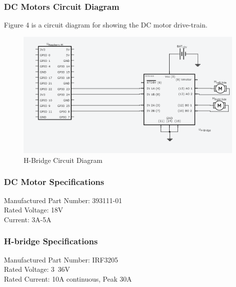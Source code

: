 \documentclass [10pt]{article}
\begin{document}

\subsubsection{DC Motors Circuit Diagram}
Figure 4 is a circuit diagram for showing the DC motor drive-train.
\begin{figure} [h!]
	\centering
	\includegraphics [scale = 0.4] {Figures/H_Bridge.png}
	\caption{H-Bridge Circuit Diagram}
\end{figure}


\subsubsection{DC Motor Specifications}
Manufactured Part Number: 393111-01\\
Rated Voltage: 18V\\
Current: 3A-5A\\


\subsubsection{H-bridge Specifications}
Manufactured Part Number:  IRF3205\\
Rated Voltage: 3~36V \\
Rated Current: 10A continuous, Peak 30A \\
\end{document}
